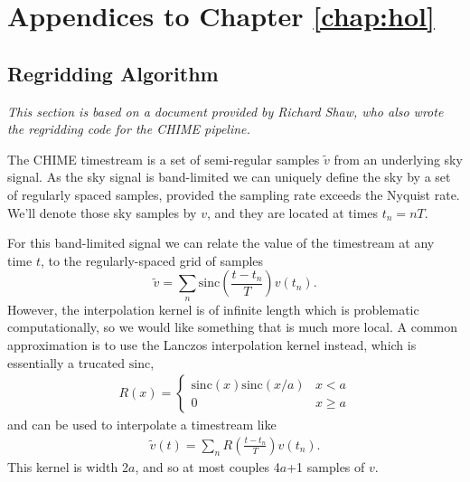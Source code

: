 \appendix

\chapter{Appendices to Chapter \ref{chap:hol}}

\section{Regridding Algorithm}
\label{app:hol:sec:regrid}

\textit{This section is based on a document provided by Richard Shaw, who also wrote the regridding code for the CHIME pipeline.}

The CHIME timestream is a set of semi-regular samples $\tilde{v}$ from an underlying sky
signal. As the sky signal is band-limited we can uniquely define the sky by a set of
regularly spaced samples, provided the sampling rate exceeds the Nyquist rate. We'll denote those sky samples by $v$, and they are located at times $t_n = n T$.

For this band-limited signal we can relate the value of the timestream at any time $t$, to the regularly-spaced grid of samples
\begin{equation}
\tilde{v} = \sum_n \mathrm{sinc}\left(\frac{t - t_n}{T}\right)v(t_n).
\end{equation}
However, the interpolation kernel is of infinite length which is problematic computationally,
so we would like something that is much more local. A common approximation
is to use the Lanczos interpolation kernel instead, which is essentially a trucated $\mathrm{sinc}$,
\begin{align}
R(x) = \begin{cases}
\mathrm{sinc}(x)\mathrm{sinc}(x/a) & x<a \\
0 & x \geq a
\end{cases}
\end{align}
and can be used to interpolate a timestream like
\begin{align}
\tilde{v}(t) = \sum_n R\left( \frac{t - t_n}{T}\right) v(t_n).
\end{align}
This kernel is width 2$a$, and so at most couples 4$a$+1 samples of $v$.


